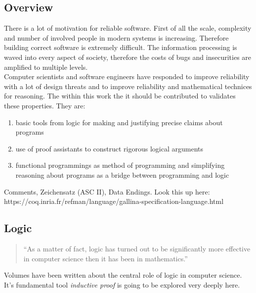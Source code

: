 \subsection{Overview}
There is a lot of motivation for reliable software. 
First of all the scale, complexity and number of involved people in modern systems is increasing.
Therefore building correct software is extremely difficult.
The information processing is waved into every aspect of society, 
therefore the costs of bugs and insecurities are amplified to multiple levels.\\
Computer scientists and software engineers have responded to improve reliability with a lot of design threats and to improve reliability and mathematical technices for reasoning.
The within this work the it should be contributed to validates these properties. They are:
\begin{enumerate}
\item basic tools from logic for making and justifying precise claims about programs
\item use of proof assistants to construct rigorous logical arguments
\item functional programmings as method of programming and simplifying reasoning about programs as a bridge between programming and logic
\end{enumerate}


Comments, Zeichensatz (ASC II), Data Endings.
Look this up here:\\
https://coq.inria.fr/refman/language/gallina-specification-language.html




\subsection{Logic}

\begin{quote}
``As a matter of fact, logic has turned out to be significantly more effective in computer science then it has been in mathematics.''
\end{quote}
Volumes have been written about the central role of logic in computer science. 
It's fundamental tool {\itshape inductive proof} is going to be explored very deeply here.

